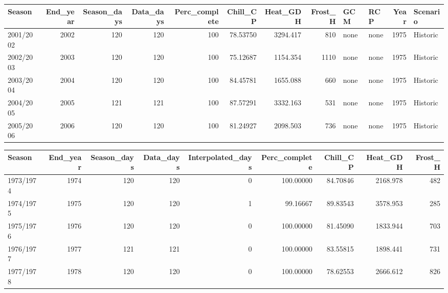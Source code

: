 \documentclass[
]{book}
\newenvironment{Shaded}{\begin{snugshade}}{\end{snugshade}}
\newcommand{\CommentTok}[1]{\textcolor[rgb]{0.56,0.35,0.01}{\textit{#1}}}
\newcommand{\DataTypeTok}[1]{\textcolor[rgb]{0.13,0.29,0.53}{#1}}
\newcommand{\DecValTok}[1]{\textcolor[rgb]{0.00,0.00,0.81}{#1}}
\newcommand{\KeywordTok}[1]{\textcolor[rgb]{0.13,0.29,0.53}{\textbf{#1}}}
\newcommand{\NormalTok}[1]{#1}
\newcommand{\OperatorTok}[1]{\textcolor[rgb]{0.81,0.36,0.00}{\textbf{#1}}}
\newcommand{\StringTok}[1]{\textcolor[rgb]{0.31,0.60,0.02}{#1}}
\begin{document}
\begingroup\fontsize{8}{10}\selectfont

\begin{tabular}{l|r|r|r|r|r|r|r|l|l|r|l}
\hline
Season & End\_year & Season\_days & Data\_days & Perc\_complete & Chill\_CP & Heat\_GDH & Frost\_H & GCM & RCP & Year & Scenario\\
\hline
2001/2002 & 2002 & 120 & 120 & 100 & 78.53750 & 3294.417 & 810 & none & none & 1975 & Historic\\
\hline
2002/2003 & 2003 & 120 & 120 & 100 & 75.12687 & 1154.354 & 1110 & none & none & 1975 & Historic\\
\hline
2003/2004 & 2004 & 120 & 120 & 100 & 84.45781 & 1655.088 & 660 & none & none & 1975 & Historic\\
\hline
2004/2005 & 2005 & 121 & 121 & 100 & 87.57291 & 3332.163 & 531 & none & none & 1975 & Historic\\
\hline
2005/2006 & 2006 & 120 & 120 & 100 & 81.24927 & 2098.503 & 736 & none & none & 1975 & Historic\\
\hline
\end{tabular}
\endgroup{}

\begin{Shaded}
\end{Shaded}

\begingroup\fontsize{8}{10}\selectfont

\begin{tabular}{l|r|r|r|r|r|r|r|r}
\hline
Season & End\_year & Season\_days & Data\_days & Interpolated\_days & Perc\_complete & Chill\_CP & Heat\_GDH & Frost\_H\\
\hline
1973/1974 & 1974 & 120 & 120 & 0 & 100.00000 & 84.70846 & 2168.978 & 482\\
\hline
1974/1975 & 1975 & 120 & 120 & 1 & 99.16667 & 89.83543 & 3578.953 & 285\\
\hline
1975/1976 & 1976 & 120 & 120 & 0 & 100.00000 & 81.45090 & 1833.944 & 703\\
\hline
1976/1977 & 1977 & 121 & 121 & 0 & 100.00000 & 83.55815 & 1898.441 & 731\\
\hline
1977/1978 & 1978 & 120 & 120 & 0 & 100.00000 & 78.62553 & 2666.612 & 826\\
\hline
\end{tabular}
\endgroup{}
\end{document}
